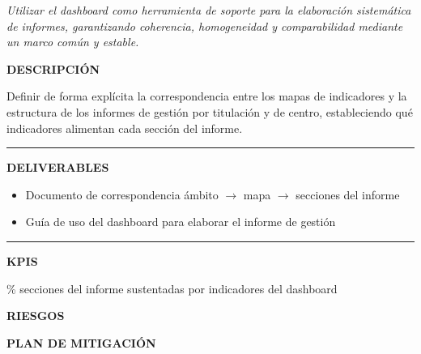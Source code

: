 \documentclass[11pt,a4paper]{scrreprt}
\newcommand{\fieldlabel}[1]{%
  {\footnotesize\sffamily\bfseries\color{mutedcolor}\MakeUppercase{#1}}\par\nopagebreak[4]
}
\newcommand{\fieldsep}{\vspace{3pt}\noindent\textcolor{bordercolor}{\rule{\linewidth}{0.4pt}}\vspace{3pt}\par}
\begin{document}
\newpage
{}
{\small\color{mutedcolor}\itshape Utilizar el dashboard como herramienta de soporte para la elaboración sistemática de informes, garantizando coherencia, homogeneidad y comparabilidad mediante un marco común y estable.}\par\vspace{6pt}

\begin{tcolorbox}[pabox={dashcolor}{PA4.1 \enspace\textbullet\enspace Alineación de los mapas de indicadores con la estructura de los informes de gestión}]

\fieldlabel{Descripci\'on}
{\small Definir de forma explícita la correspondencia entre los mapas de indicadores y la estructura de los informes de gestión por titulación y de centro, estableciendo qué indicadores alimentan cada sección del informe.}\par
\fieldsep
\fieldlabel{Deliverables}
{\small \begin{itemize}[noitemsep,topsep=2pt]
\item Documento de correspondencia ámbito $\rightarrow$ mapa $\rightarrow$ secciones del informe
\item Guía de uso del dashboard para elaborar el informe de gestión
\end{itemize}}\par
\fieldsep
\fieldlabel{KPIs}
{\small \% secciones del informe sustentadas por indicadores del dashboard}\par
\end{tcolorbox}
\begin{tcolorbox}[riskbox]
{\footnotesize\sffamily\bfseries\color{red!50!black} RIESGOS}\par{}
\end{tcolorbox}
\begin{tcolorbox}[mitbox]
{\footnotesize\sffamily\bfseries\color{green!40!black} PLAN DE MITIGACI\'ON}\par{}
\end{tcolorbox}
\vspace{8pt}
\end{document}
